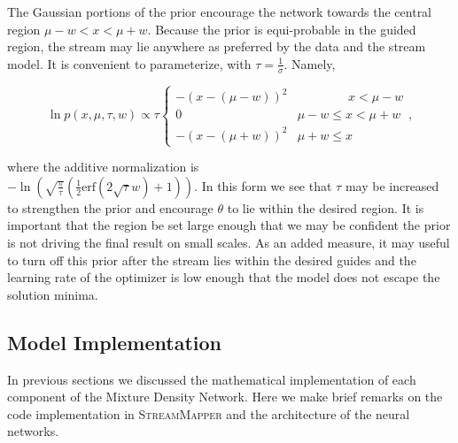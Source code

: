 \documentclass[twocolumn, linenumbers]{aastex631}
\newcommand{\code}[1]{\textsc{#1}}
\newcommand{\package}[1]{\code{#1}}
\newcommand{\pdf}{p}
\begin{document}
            The Gaussian portions of the prior encourage the network towards the
            central region $\mu - w < x < \mu + w$. Because the prior is
            equi-probable in the guided region, the stream may lie anywhere as
            preferred by the data and the stream model.  It is convenient to
            parameterize, with $\tau = \frac{1}{\sigma}$. Namely,
            \begin{small}
            \begin{equation}
                \ln \pdf(x,\mu, \tau, w) \propto \tau
                \begin{cases} 
                    -\left(x-(\mu-w)\right)^2 & \phantom{\mu - w <}\ x < \mu - w \\
                    0 & \mu - w \leq x < \mu + w \\
                    -\left(x-(\mu+w)\right)^2 & \mu + w \leq x
                \end{cases},
            \end{equation}
            \end{small}
            where the additive normalization is
            \\
            $-\ln\left(\sqrt{\frac{\pi}{\tau}}
            \left(\frac{1}{2}\text{erf}\left(2 \sqrt{\tau }
            w\right)+1\right)\right)$.  In this form we see that $\tau$ may be
            increased to strengthen the prior and encourage $\theta$ to lie
            within the desired region. It is important that the region be set
            large enough that we may be confident the prior is not driving the
            final result on small scales. As an added measure, it may useful to
            turn off this prior after the stream lies within the desired guides
            and the learning rate of the optimizer is low enough that the model
            does not escape the solution minima.



    \subsection{Model Implementation} \label{sub:methods:model_implementation}

        In previous sections we discussed the mathematical implementation of
        each component of the Mixture Density Network. Here we make brief
        remarks on the code implementation in \package{StreamMapper} and the
        architecture of the neural networks.
\end{document}
